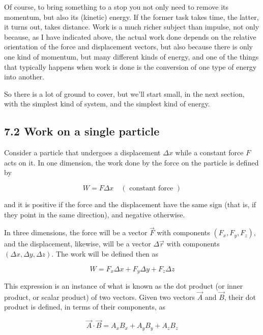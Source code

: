 \documentclass[10pt]{article}
\begin{document}
Of course, to bring something to a stop you not only need to remove its momentum, but also its (kinetic) energy. If the former task takes time, the latter, it turns out, takes distance. Work is a much richer subject than impulse, not only because, as I have indicated above, the actual work done depends on the relative orientation of the force and displacement vectors, but also because there is only one kind of momentum, but many different kinds of energy, and one of the things that typically happens when work is done is the conversion of one type of energy into another.

So there is a lot of ground to cover, but we'll start small, in the next section, with the simplest kind of system, and the simplest kind of energy.

\subsection*{7.2 Work on a single particle}
Consider a particle that undergoes a displacement $\Delta x$ while a constant force $F$ acts on it. In one dimension, the work done by the force on the particle is defined by


\begin{equation*}
W=F \Delta x \quad(\text { constant force }) \tag{7.4}
\end{equation*}


and it is positive if the force and the displacement have the same sign (that is, if they point in the same direction), and negative otherwise.

In three dimensions, the force will be a vector $\vec{F}$ with components $\left(F_{x}, F_{y}, F_{z}\right)$, and the displacement, likewise, will be a vector $\Delta \vec{r}$ with components $(\Delta x, \Delta y, \Delta z)$. The work will be defined then as


\begin{equation*}
W=F_{x} \Delta x+F_{y} \Delta y+F_{z} \Delta z \tag{7.5}
\end{equation*}


This expression is an instance of what is known as the dot product (or inner product, or scalar product) of two vectors. Given two vectors $\vec{A}$ and $\vec{B}$, their dot product is defined, in terms of their components, as


\begin{equation*}
\vec{A} \cdot \vec{B}=A_{x} B_{x}+A_{y} B_{y}+A_{z} B_{z} \tag{7.6}
\end{equation*}
\end{document}
